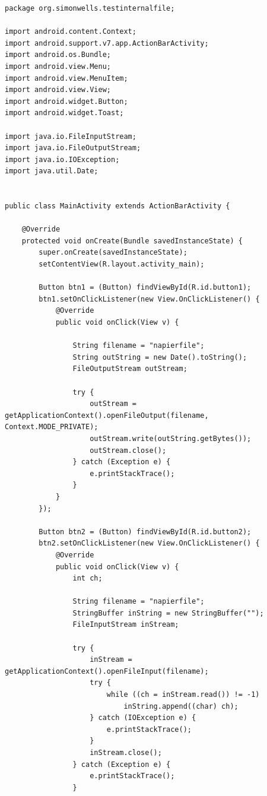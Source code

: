 \begin{lstlisting}
package org.simonwells.testinternalfile;

import android.content.Context;
import android.support.v7.app.ActionBarActivity;
import android.os.Bundle;
import android.view.Menu;
import android.view.MenuItem;
import android.view.View;
import android.widget.Button;
import android.widget.Toast;

import java.io.FileInputStream;
import java.io.FileOutputStream;
import java.io.IOException;
import java.util.Date;


public class MainActivity extends ActionBarActivity {

    @Override
    protected void onCreate(Bundle savedInstanceState) {
        super.onCreate(savedInstanceState);
        setContentView(R.layout.activity_main);

        Button btn1 = (Button) findViewById(R.id.button1);
        btn1.setOnClickListener(new View.OnClickListener() {
            @Override
            public void onClick(View v) {

                String filename = "napierfile";
                String outString = new Date().toString();
                FileOutputStream outStream;

                try {
                    outStream = getApplicationContext().openFileOutput(filename, Context.MODE_PRIVATE);
                    outStream.write(outString.getBytes());
                    outStream.close();
                } catch (Exception e) {
                    e.printStackTrace();
                }
            }
        });

        Button btn2 = (Button) findViewById(R.id.button2);
        btn2.setOnClickListener(new View.OnClickListener() {
            @Override
            public void onClick(View v) {
                int ch;

                String filename = "napierfile";
                StringBuffer inString = new StringBuffer("");
                FileInputStream inStream;

                try {
                    inStream = getApplicationContext().openFileInput(filename);
                    try {
                        while ((ch = inStream.read()) != -1)
                            inString.append((char) ch);
                    } catch (IOException e) {
                        e.printStackTrace();
                    }
                    inStream.close();
                } catch (Exception e) {
                    e.printStackTrace();
                }


\end{lstlisting}
